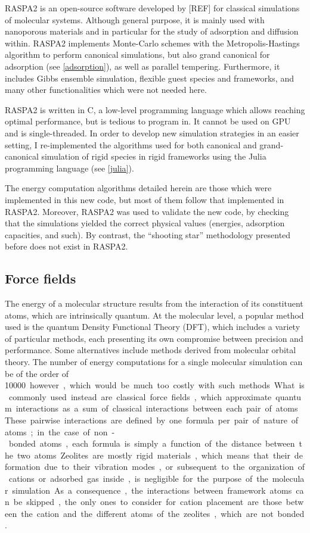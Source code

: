 \documentclass[main.tex]{subfiles}
\begin{document}
RASPA2 is an open-source software developed by [REF] for classical simulations of molecular systems. Although general purpose, it is mainly used with nanoporous materials and in particular for the study of adsorption and diffusion within. RASPA2 implements Monte-Carlo schemes with the Metropolis-Hastings algorithm to perform canonical simulations, but also grand canonical for adsorption (see \cref{adsorption}), as well as parallel tempering. Furthermore, it includes Gibbs ensemble simulation, flexible guest species and frameworks, and many other functionalities which were not needed here.

RASPA2 is written in C, a low-level programming language which allows reaching optimal performance, but is tedious to program in. It cannot be used on GPU and is single-threaded. In order to develop new simulation strategies in an easier setting, I re-implemented the algorithms used for both canonical and grand-canonical simulation of rigid species in rigid frameworks using the Julia programming language (see \cref{julia}).

The energy computation algorithms detailed herein are those which were implemented in this new code, but most of them follow that implemented in RASPA2. Moreover, RASPA2 was used to validate the new code, by checking that the simulations yielded the correct physical values (energies, adsorption capacities, and such). By contrast, the ``shooting star'' methodology presented before does not exist in RASPA2.

\subsection{Force fields}

\label{forcefields}

The energy of a molecular structure results from the interaction of its constituent atoms, which are intrinsically quantum. At the molecular level, a popular method used is the quantum Density Functional Theory (DFT), which includes a variety of particular methods, each presenting its own compromise between precision and performance. Some alternatives include methods derived from molecular orbital theory. The number of energy computations for a single molecular simulation can be of the order of \qty{10000} however, which would be much too costly with such methods.

What is commonly used instead are classical force fields, which approximate quantum interactions as a sum of classical interactions between each pair of atoms. These pairwise interactions are defined by one formula per pair of nature of atoms; in the case of non-bonded atoms, each formula is simply a function of the distance between the two atoms. Zeolites are mostly rigid materials, which means that their deformation due to their vibration modes, or subsequent to the organization of cations or adsorbed gas inside, is negligible for the purpose of the molecular simulation. As a consequence, the interactions between framework atoms can be skipped, the only ones to consider for cation placement are those between the cation and the different atoms of the zeolites, which are not bonded.
\end{document}
